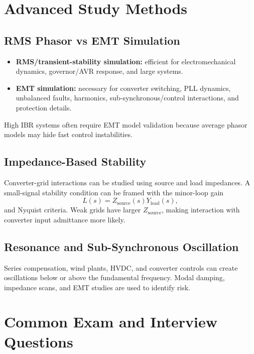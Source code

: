 \documentclass[11pt]{article}
\begin{document}
\section{Advanced Study Methods}

\subsection{RMS Phasor vs EMT Simulation}
\begin{itemize}
  \item \textbf{RMS/transient-stability simulation:} efficient for electromechanical
  dynamics, governor/AVR response, and large systems.
  \item \textbf{EMT simulation:} necessary for converter switching, PLL dynamics,
  unbalanced faults, harmonics, sub-synchronous/control interactions, and
  protection details.
\end{itemize}
High IBR systems often require EMT model validation because average phasor models
may hide fast control instabilities.

\subsection{Impedance-Based Stability}
Converter-grid interactions can be studied using source and load impedances. A
small-signal stability condition can be framed with the minor-loop gain
\begin{equation}
L(s)=Z_{\mathrm{source}}(s)Y_{\mathrm{load}}(s),
\end{equation}
and Nyquist criteria. Weak grids have larger $Z_{\mathrm{source}}$, making
interaction with converter input admittance more likely.

\subsection{Resonance and Sub-Synchronous Oscillation}
Series compensation, wind plants, HVDC, and converter controls can create
oscillations below or above the fundamental frequency. Modal damping,
impedance scans, and EMT studies are used to identify risk.

\section{Common Exam and Interview Questions}
\end{document}
